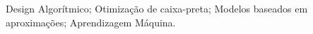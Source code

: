 \noindent Design Algorítmico; Otimização de caixa-preta; Modelos baseados em aproximações; Aprendizagem Máquina.